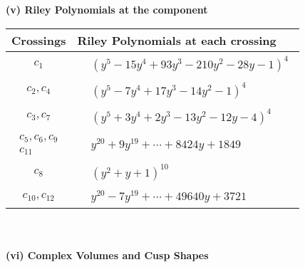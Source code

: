 \documentclass[1p]{elsarticle_modified}
\theoremstyle{definition}
\begin{document}
\newpage\renewcommand{\arraystretch}{1}
\flushleft \textbf{(v) Riley Polynomials at the component}\newline \\
\begin{tabular}{m{50pt}|m{274pt}}
Crossings & \hspace{64pt}Riley Polynomials at each crossing \\
\hline $$\begin{aligned}c_{1}\end{aligned}$$&$\begin{aligned}
&(y^5-15 y^4+93 y^3-210 y^2-28 y-1)^4
\end{aligned}$\\
\hline $$\begin{aligned}c_{2},c_{4}\end{aligned}$$&$\begin{aligned}
&(y^5-7 y^4+17 y^3-14 y^2-1)^4
\end{aligned}$\\
\hline $$\begin{aligned}c_{3},c_{7}\end{aligned}$$&$\begin{aligned}
&(y^5+3 y^4+2 y^3-13 y^2-12 y-4)^4
\end{aligned}$\\
\hline $$\begin{aligned}c_{5},c_{6},c_{9}\\c_{11}\end{aligned}$$&$\begin{aligned}
&y^{20}+9 y^{19}+\cdots+8424 y+1849
\end{aligned}$\\
\hline $$\begin{aligned}c_{8}\end{aligned}$$&$\begin{aligned}
&(y^2+y+1)^{10}
\end{aligned}$\\
\hline $$\begin{aligned}c_{10},c_{12}\end{aligned}$$&$\begin{aligned}
&y^{20}-7 y^{19}+\cdots+49640 y+3721
\end{aligned}$\\
\hline
\end{tabular}\\~\\
\newpage\flushleft \textbf{(vi) Complex Volumes and Cusp Shapes}
\end{document}
